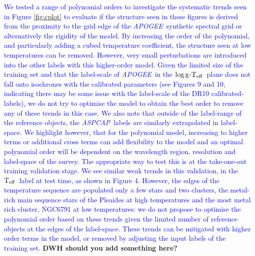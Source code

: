 \documentclass[12pt, preprint]{aastex}
\newcommand{\apogee}{\textsl{APOGEE}}
\newcommand{\aspcap}{\textsl{ASPCAP}}
\newcommand{\teff}{\mbox{$\rm T_{eff}$}}
\newcommand{\logg}{\mbox{$\rm \log g$}}
\begin{document}
\textcolor{blue}{We tested a range of polynomial orders to investigate the systematic trends seen in Figure \ref{fig:cplot} to evaluate if the structure seen in these figures is derived from the proximity to the grid edge of the \apogee\ synthetic spectral grid or alternatively the rigidity of the model. By increasing the order of the polynomial, and particularly adding a cubed temperature coefficient, the structure seen at low temperatures can be removed. However, very small perturbations are introduced into the other labels with this higher-order model. Given the limited size of the training set and that the label-scale of \apogee\ in the \logg-\teff\ plane does not fall onto isochrones with the calibrated parameters (see Figures 9 and 10, indicating there may be some issue with the label-scale of the DR10 calibrated-labels), we do not try to optimise the model to obtain the best order to remove any of these trends in this case.  We also note that outside of the label-range of the reference objects, the \aspcap\ labels are similarly extrapolated in label-space.  We highlight however, that for the polynomial model, increasing to higher terms or additional cross terms can add flexibility to the model and an optimal polynomial order will be dependent on the wavelength region, resolution and label-space of the survey. The appropriate way to test this is at the take-one-out training validation stage. We see similar weak trends in this validation, in the \teff\ label at test time, as shown in Figure 4. However, the edges of the temperature sequence are populated only a few stars and two clusters, the metal-rich main sequence stars of the Pleaides at high temperatures and the most metal rich cluster, NGC6791 at low temperatures: we do not propose to optimise the polynomial order based on these trends given the limited number of reference objects at the edges of the label-space. These trends can be mitigated with higher order terms in the model, or removed by adjusting the input labels of the training set.}  \textbf{DWH should you add something here?}
\end{document}
